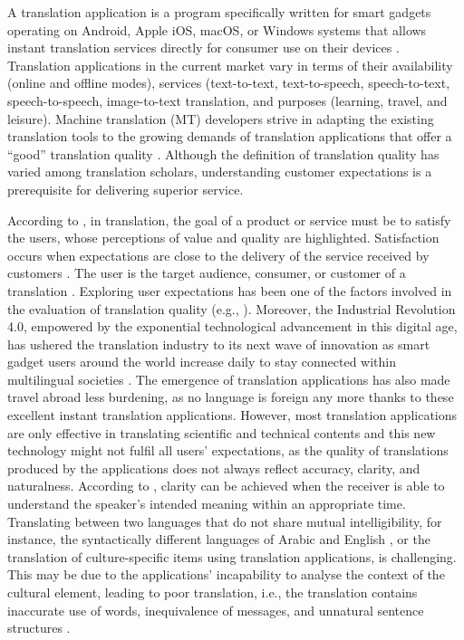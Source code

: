 \documentclass[english]{textolivre}
\begin{document}
A translation application is a program specifically written for smart gadgets operating on Android, Apple iOS, macOS, or Windows systems that allows instant translation services directly for consumer use on their devices \cite{chen_machine_2017}. Translation applications in the current market vary in terms of their availability (online and offline modes), services (text-to-text, text-to-speech, speech-to-text, speech-to-speech, image-to-text translation, and purposes (learning, travel, and leisure). Machine translation (MT) developers strive in adapting the existing translation tools to the growing demands of translation applications that offer a “good” translation quality \cite{way_quality_2018}. Although the definition of translation quality has varied among translation scholars, understanding customer expectations is a prerequisite for delivering superior service.
  
According to \textcite{kurz_conference_2002}, in translation, the goal of a product or service must be to satisfy the users, whose perceptions of value and quality are highlighted. Satisfaction occurs when expectations are close to the delivery of the service received by customers \cite{khristianto_influence_2012}. The user is the target audience, consumer, or customer of a translation \cite{schjoldager_understanding_2008}. Exploring user expectations has been one of the factors involved in the evaluation of translation quality (e.g., \textcite{kurz_conference_1993,tommola_estimating_2003}). Moreover, the Industrial Revolution 4.0, empowered by the exponential technological advancement in this digital age, has ushered the translation industry to its next wave of innovation as smart gadget users around the world increase daily to stay connected within multilingual societies \cite{chen_machine_2017,jimenez_crespo_mobile_2016}. The emergence of translation applications has also made travel abroad less burdening, as no language is foreign any more thanks to these excellent instant translation applications. However, most translation applications are only effective in translating scientific and technical contents and this new technology might not fulfil all users’ expectations, as the quality of translations produced by the applications does not always reflect accuracy, clarity, and naturalness. According to \textcite{chesterman_memes_2000}, clarity can be achieved when the receiver is able to understand the speaker’s intended meaning within an appropriate time. Translating between two languages that do not share mutual intelligibility, for instance, the syntactically different languages of Arabic and English \cite{alqudsi_arabic_2014}, or the translation of culture-specific items using translation applications, is challenging. This may be due to the applications’ incapability to analyse the context of the cultural element, leading to poor translation, i.e., the translation contains inaccurate use of words, inequivalence of messages, and unnatural sentence structures \cite{nababan_teori_2008}.
\end{document}
